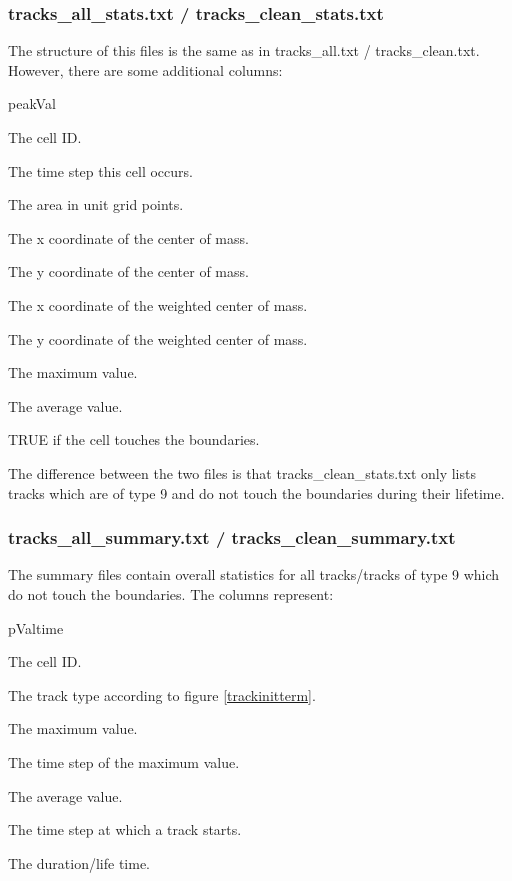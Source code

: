 \documentclass{scrartcl}
\begin{document}
\subsubsection{tracks\_all\_stats.txt / tracks\_clean\_stats.txt}
The structure of this files is the same as in tracks\_all.txt / tracks\_clean.txt. However, there are some additional columns:
\begin{labeling}{peakVal}
	\item[clID] The cell ID.
	\item[tsclID] The time step this cell occurs.
	\item[clarea] The area in unit grid points.
	\item[clcmassX] The x coordinate of the center of mass.
	\item[clcmassY] The y coordinate of the center of mass.
	\item[wclcmassX] The x coordinate of the weighted center of mass.
	\item[wclcmassY] The y coordinate of the weighted center of mass.
	\item[peakVal] The maximum value.
	\item[avVal] The average value.
	\item[bound] TRUE if the cell touches the boundaries.
\end{labeling}
The difference between the two files is that tracks\_clean\_stats.txt only lists tracks which are of type 9 and do not touch the boundaries during their lifetime.

\subsubsection{tracks\_all\_summary.txt / tracks\_clean\_summary.txt}
The summary files contain overall statistics for all tracks/tracks of type 9 which do not touch the boundaries. The columns represent:
\begin{labeling}{pValtime}
	\item[trackID] The cell ID.
	\item[trType] The track type according to figure \ref{trackinitterm}.
	\item[peakVal] The maximum value.
	\item[pValtime] The time step of the maximum value.
	\item[avVal] The average value.	
	\item[start] The time step at which a track starts.
	\item[dur] The duration/life time.
\end{labeling}

\newpage


\end{document}
